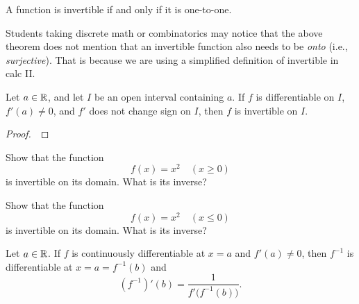 \vfill

\newpage

\begin{theorem}
A function is invertible if and only if it is one-to-one.
\end{theorem}

\begin{remark}
Students taking discrete math or combinatorics may notice that the above theorem does not mention that an invertible function also needs to be \textit{onto} (i.e., \textit{surjective}).
That is because we are using a simplified definition of invertible in calc II.
\end{remark}

\begin{corollary}
Let $a\in\mathbb R$, and let $I$ be an open interval containing $a$.
If $f$ is differentiable on $I$, $f'(a)\ne 0$, and $f'$ does not change sign on $I$, then $f$ is invertible on $I$.
\end{corollary}

\begin{proof}\,

\vspace{4in}

\end{proof}

\newpage

\begin{example}
Show that the function
\begin{equation*}
f(x)=x^2\quad (x\ge 0)
\end{equation*}
is invertible on its domain.
What is its inverse?
\end{example}

\vfill

\begin{example}
Show that the function
\begin{equation*}
f(x)=x^2\quad (x\le 0)
\end{equation*}
is invertible on its domain.
What is its inverse?
\end{example}

\vfill

\newpage

\begin{theorem}
Let $a\in\mathbb R$.
If $f$ is continuously differentiable at $x=a$ and $f'(a)\ne 0$, then $f^{-1}$ is differentiable at $x=a=f^{-1}(b)$ and
 \begin{equation*}
 \left(f^{-1}\right)'(b) = \frac{1}{f'\big(f^{-1}(b)\big)}.
 \end{equation*}
\end{theorem}

